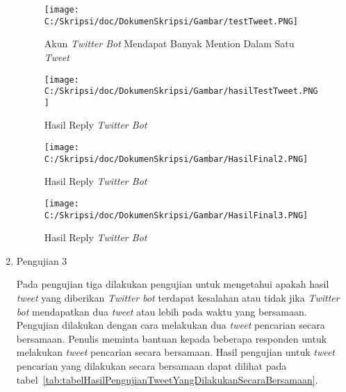 \begin{enumerate}
	\begin{figure}
		\centering
			\texttt{[image: C:/Skripsi/doc/DokumenSkripsi/Gambar/testTweet.PNG]}
		\caption{Akun \textit{Twitter Bot} Mendapat Banyak Mention Dalam Satu \textit{Tweet}}
		\label{fig:testTweet}
	\end{figure}
	
	\begin{figure}
		\centering
			\texttt{[image: C:/Skripsi/doc/DokumenSkripsi/Gambar/hasilTestTweet.PNG]}
		\caption{Hasil Reply \textit{Twitter Bot}}
		\label{fig:hasilTestTweet}
	\end{figure}
	
	\begin{figure}
		\centering
			\texttt{[image: C:/Skripsi/doc/DokumenSkripsi/Gambar/HasilFinal2.PNG]}
			\caption{Hasil Reply \textit{Twitter Bot}}
		\label{fig:HasilFinal2}
	\end{figure}
	
	\begin{figure}
		\centering
			\texttt{[image: C:/Skripsi/doc/DokumenSkripsi/Gambar/HasilFinal3.PNG]}
			\caption{Hasil Reply \textit{Twitter Bot}}
		\label{fig:HasilFinal3}
	\end{figure}
	
	\clearpage
	\item Pengujian 3
	
	Pada pengujian tiga dilakukan pengujian untuk mengetahui apakah hasil \textit{tweet} yang diberikan \textit{Twitter bot} terdapat kesalahan atau tidak jika \textit{Twitter bot} mendapatkan dua \textit{tweet} atau lebih pada waktu yang bersamaan. Pengujian dilakukan dengan cara melakukan dua \textit{tweet} pencarian secara bersamaan. Penulis meminta bantuan kepada beberapa responden untuk melakukan \textit{tweet} pencarian secara bersamaan. Hasil pengujian untuk \textit{tweet} pencarian yang dilakukan secara bersamaan dapat dilihat pada tabel~\ref{tab:tabelHasilPengujianTweetYangDilakukanSecaraBersamaan}.
	

\end{enumerate}
